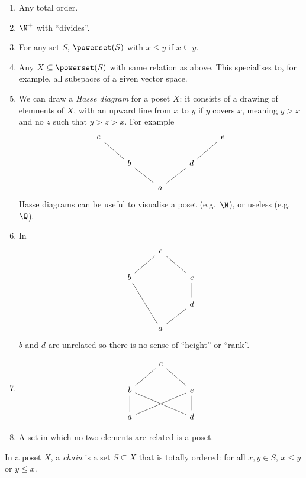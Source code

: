 \documentclass[a4paper]{article}
\begin{document}
\begin{eg}\leavevmode
  \begin{enumerate}
  \item Any total order.
  \item \(\N^+\) with ``divides''.
  \item For any set \(S\), \(\powerset(S)\) with \(x \leq y\) if \(x \subseteq y\).
  \item Any \(X \subseteq \powerset(S)\) with same relation as above. This specialises to, for example, all subspaces of a given vector space.
  \item We can draw a \emph{Hasse diagram} for a poset \(X\): it consists of a drawing of elemnents of \(X\), with an upward line from \(x\) to \(y\) if \(y\) covers \(x\), meaning \(y > x\) and no \(z\) such that \(y > z > x\). For example
    \[
      \begin{tikzcd}
        c \ar[dr, dash] & & & & e \ar[dl, dash] \\
        & b \ar[dr, dash] & & d \ar[dl, dash] \\
        & & a
      \end{tikzcd}
    \]
    Hasse diagrams can be useful to visualise a poset (e.g.\ \(\N\)), or useless (e.g.\ \(\Q\)).
  \item In
    \[
      \begin{tikzcd}
        & c \ar[dl, dash] \ar[dr, dash] \\
        b \ar[ddr, dash] & & c \ar[d, dash] \\
        & & d \ar[dl, dash] \\
        & a
      \end{tikzcd}
    \]
    \(b\) and \(d\) are unrelated so there is no sense of ``height'' or ``rank''.
  \item
    \[
      \begin{tikzcd}
        & c \ar[dl, dash] \ar[dr, dash] \\
        b \ar[d, dash] \ar[drr, dash] & & e \ar[d, dash] \ar[dll, dash] \\
        a & & d
      \end{tikzcd}
    \]
  \item A set in which no two elements are related is a poset.
  \end{enumerate}
\end{eg}

\begin{definition}[Chain]
  In a poset \(X\), a \emph{chain} is a set \(S \subseteq X\) that is totally ordered: for all \(x, y \in S\), \(x \leq y\) or \(y \leq x\).
\end{definition}
\end{document}
